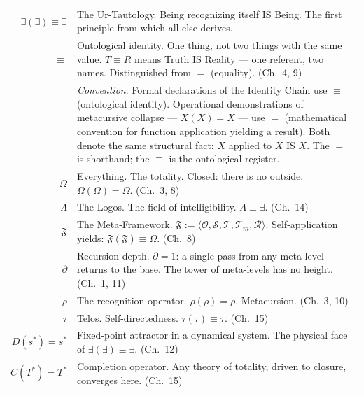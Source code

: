 \documentclass[10pt, openany, oneside]{book}
\renewcommand{\footnotesize}{\fontsize{8.5}{11}\selectfont}
\begin{document}
{\footnotesize
\noindent\begin{tabular}{@{} r @{\hspace{0.6em}} p{} @{}}
$\exists(\exists) \equiv \exists$ & The Ur-Tautology. Being recognizing itself IS Being. The first principle from which all else derives. \\[0.3em]
$\equiv$ & Ontological identity. One thing, not two things with the same value. $T \equiv R$ means Truth IS Reality --- one referent, two names. Distinguished from $=$ (equality). (Ch.\ 4, 9) \\[0.3em]
& \textit{Convention}: Formal declarations of the Identity Chain use $\equiv$ (ontological identity). Operational demonstrations of metacursive collapse --- $X(X) = X$ --- use $=$ (mathematical convention for function application yielding a result). Both denote the same structural fact: $X$ applied to $X$ IS $X$. The $=$ is shorthand; the $\equiv$ is the ontological register. \\[0.3em]
$\Omega$ & Everything. The totality. Closed: there is no outside. $\Omega(\Omega) = \Omega$. (Ch.\ 3, 8) \\[0.3em]
$\Lambda$ & The Logos. The field of intelligibility. $\Lambda \equiv \exists$. (Ch.\ 14) \\[0.3em]
$\mathfrak{F}$ & The Meta-Framework. $\mathfrak{F} := \langle \mathcal{O}, \mathcal{S}, \mathcal{T}, \mathcal{T}_m, \mathcal{R} \rangle$. Self-application yields: $\mathfrak{F}(\mathfrak{F}) \equiv \Omega$. (Ch.\ 8) \\[0.3em]
$\partial$ & Recursion depth. $\partial = 1$: a single pass from any meta-level returns to the base. The tower of meta-levels has no height. (Ch.\ 1, 11) \\[0.3em]
$\rho$ & The recognition operator. $\rho(\rho) = \rho$. Metacursion. (Ch.\ 3, 10) \\[0.3em]
$\tau$ & Telos. Self-directedness. $\tau(\tau) \equiv \tau$. (Ch.\ 15) \\[0.3em]
$D(s^*)=s^*$ & Fixed-point attractor in a dynamical system. The physical face of $\exists(\exists) \equiv \exists$. (Ch.\ 12) \\[0.3em]
$C(T^*)=T^*$ & Completion operator. Any theory of totality, driven to closure, converges here. (Ch.\ 15) \\[0.3em]
\end{tabular}
}

\vspace{0.5em}
\end{document}
